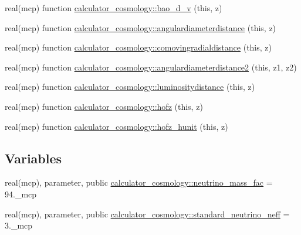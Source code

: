 \begin{DoxyCompactItemize}
\item 
real(mcp) function \mbox{\hyperlink{namespacecalculator__cosmology_ab4785ac8ce58853984614bac368590aa}{calculator\+\_\+cosmology\+::bao\+\_\+d\+\_\+v}} (this, z)
\item 
real(mcp) function \mbox{\hyperlink{namespacecalculator__cosmology_a703b9e272151719cca42f7d37d7d403f}{calculator\+\_\+cosmology\+::angulardiameterdistance}} (this, z)
\item 
real(mcp) function \mbox{\hyperlink{namespacecalculator__cosmology_a56ce70cf463f7c6df9c6d59a9459b993}{calculator\+\_\+cosmology\+::comovingradialdistance}} (this, z)
\item 
real(mcp) function \mbox{\hyperlink{namespacecalculator__cosmology_a3a138f6f81a4341d3017e38fce77b905}{calculator\+\_\+cosmology\+::angulardiameterdistance2}} (this, z1, z2)
\item 
real(mcp) function \mbox{\hyperlink{namespacecalculator__cosmology_a0b1cc6537ad803bf83a690a40c4e1550}{calculator\+\_\+cosmology\+::luminositydistance}} (this, z)
\item 
real(mcp) function \mbox{\hyperlink{namespacecalculator__cosmology_a04681553ca8acc12385e91c6b720105a}{calculator\+\_\+cosmology\+::hofz}} (this, z)
\item 
real(mcp) function \mbox{\hyperlink{namespacecalculator__cosmology_aabad31ec70f213aae297f0c1d31880fc}{calculator\+\_\+cosmology\+::hofz\+\_\+hunit}} (this, z)
\end{DoxyCompactItemize}
\subsection*{Variables}
\begin{DoxyCompactItemize}
\item 
real(mcp), parameter, public \mbox{\hyperlink{namespacecalculator__cosmology_a9199e46da0bd753de17a9be358823ee0}{calculator\+\_\+cosmology\+::neutrino\+\_\+mass\+\_\+fac}} = 94.\+\_\+mcp
\item 
real(mcp), parameter, public \mbox{\hyperlink{namespacecalculator__cosmology_a807c6e74e20e797dcbf2cd848b181a95}{calculator\+\_\+cosmology\+::standard\+\_\+neutrino\+\_\+neff}} = 3.\+\_\+mcp
\end{DoxyCompactItemize}
